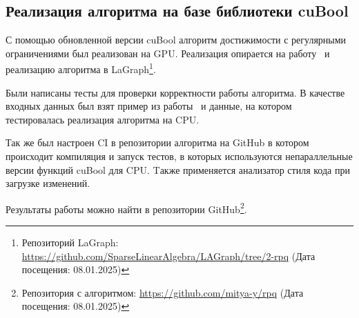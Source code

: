 \subsection{Реализация алгоритма на базе библиотеки cuBool}

С помощью обновленной версии cuBool алгоритм достижимости с регулярными ограничениями был реализован на GPU. Реализация опирается на работу~\cite{OldRpqVkr} и реализацию алгоритма в LaGraph\footnote{Репозиторий LaGraph: \url{https://github.com/SparseLinearAlgebra/LAGraph/tree/2-rpq} (Дата посещения: 08.01.2025)}.

Были написаны тесты для проверки корректности работы алгоритма. В качестве входных данных был взят пример из работы~\cite{OldRpqVkr} и данные, на котором тестировалась реализация алгоритма на CPU.

Так же был настроен CI в репозитории алгоритма на GitHub в котором происходит компиляция и запуск тестов, в которых используются непараллельные версии функций cuBool для CPU. Tакже применяется анализатор стиля кода при загрузке изменений.

Результаты работы можно найти в репозитории GitHub\footnote{Репозитория с алгоритмом: \url{https://github.com/mitya-y/rpq} (Дата посещения: 08.01.2025)}.
